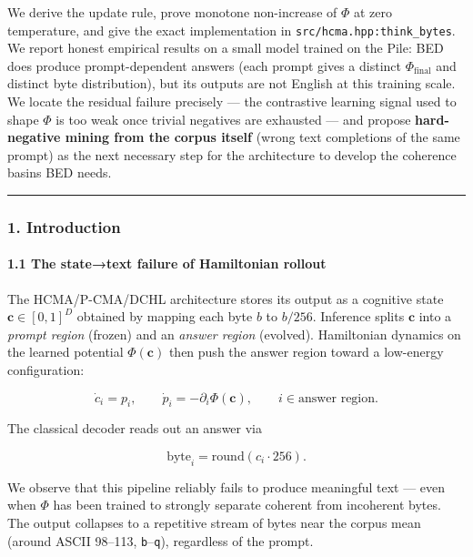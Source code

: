 \documentclass[
  11pt,
  a4paper,
]{article}
\begin{document}
We derive the update rule, prove monotone non-increase of \(\Phi\) at
zero temperature, and give the exact implementation in
\texttt{src/hcma.hpp:think\_bytes}. We report honest empirical results
on a small model trained on the Pile: BED does produce prompt-dependent
answers (each prompt gives a distinct \(\Phi_{\text{final}}\) and
distinct byte distribution), but its outputs are not English at this
training scale. We locate the residual failure precisely --- the
contrastive learning signal used to shape \(\Phi\) is too weak once
trivial negatives are exhausted --- and propose \textbf{hard-negative
mining from the corpus itself} (wrong text completions of the same
prompt) as the next necessary step for the architecture to develop the
coherence basins BED needs.

\begin{center}\rule{0.5\linewidth}{0.5pt}\end{center}

\subsubsection{1. Introduction}\label{introduction-1}

\paragraph{1.1 The state→text failure of Hamiltonian
rollout}\label{the-statetext-failure-of-hamiltonian-rollout}

The HCMA/P-CMA/DCHL architecture stores its output as a cognitive state
\(\mathbf{c} \in [0,1]^D\) obtained by mapping each byte \(b\) to
\(b/256\). Inference splits \(\mathbf{c}\) into a \emph{prompt region}
(frozen) and an \emph{answer region} (evolved). Hamiltonian dynamics on
the learned potential \(\Phi(\mathbf{c})\) then push the answer region
toward a low-energy configuration:

\[
\dot{c}_i = p_i, \qquad \dot{p}_i = -\partial_i \Phi(\mathbf{c}), \qquad i \in \text{answer region}.
\]

The classical decoder reads out an answer via

\[
\text{byte}_i = \text{round}(c_i \cdot 256).
\]

We observe that this pipeline reliably fails to produce meaningful text
--- even when \(\Phi\) has been trained to strongly separate coherent
from incoherent bytes. The output collapses to a repetitive stream of
bytes near the corpus mean (around ASCII 98--113,
\texttt{b}--\texttt{q}), regardless of the prompt.
\end{document}
